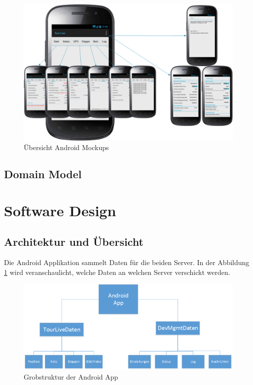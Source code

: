 \begin{figure}[H]
	\centering
	\includegraphics[width=150mm]{images/android/OverviewAndroid.png}
	\caption{Übersicht Android Mockups}
\end{figure}

\subsection{Domain Model}


\section{Software Design}
\subsection{Architektur und Übersicht}
Die Android Applikation sammelt Daten für die beiden Server. In der Abbildung \ref{fig:grobstrukturandroid}
 wird veranschaulicht, welche Daten an welchen Server verschickt werden.

\begin{figure}[H]
	\centering
	\includegraphics[width=120mm]{images/android/uebersicht.png}
	\caption{Grobstruktur der Android App}
	\label{fig:grobstrukturandroid} 
\end{figure}


